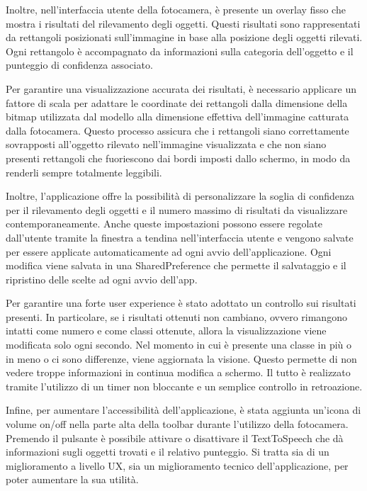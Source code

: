 Inoltre, nell'interfaccia utente della fotocamera, è presente un overlay fisso che mostra i risultati del rilevamento degli oggetti. Questi risultati sono
rappresentati da rettangoli posizionati sull'immagine in base alla posizione degli oggetti rilevati. Ogni rettangolo è accompagnato da informazioni sulla
categoria dell'oggetto e il punteggio di confidenza associato.

Per garantire una visualizzazione accurata dei risultati, è necessario applicare un fattore di scala per adattare le coordinate dei rettangoli dalla
dimensione della bitmap utilizzata dal modello alla dimensione effettiva dell'immagine catturata dalla fotocamera. Questo processo assicura che i rettangoli
siano correttamente sovrapposti all'oggetto rilevato nell'immagine visualizzata e che non siano presenti rettangoli che fuoriescono dai bordi imposti dallo
schermo, in modo da renderli sempre totalmente leggibili.

Inoltre, l'applicazione offre la possibilità di personalizzare la soglia di confidenza per il rilevamento degli oggetti e il numero massimo di risultati da
visualizzare contemporaneamente. Anche queste impostazioni possono essere regolate dall'utente tramite la finestra a tendina nell'interfaccia utente e
vengono salvate per essere applicate automaticamente ad ogni avvio dell'applicazione.
Ogni modifica viene salvata in una SharedPreference che permette il salvataggio e il ripristino delle scelte ad ogni avvio dell’app.

Per garantire una forte user experience è stato adottato un controllo sui risultati presenti. In particolare, se i risultati ottenuti non cambiano, ovvero
rimangono intatti come numero e come classi ottenute, allora la visualizzazione viene modificata solo ogni secondo. Nel momento in cui è presente una classe
in più o in meno o ci sono differenze, viene aggiornata la visione. Questo permette di non vedere troppe informazioni in continua modifica a schermo. Il
tutto è realizzato tramite l’utilizzo di un timer non bloccante e un semplice controllo in retroazione.

Infine, per aumentare l’accessibilità dell’applicazione, è stata aggiunta un’icona di volume on/off nella parte alta della toolbar durante l’utilizzo
della fotocamera. Premendo il pulsante è possibile attivare o disattivare il TextToSpeech che dà informazioni sugli oggetti trovati e il relativo
punteggio. Si tratta sia di un miglioramento a livello UX, sia un miglioramento tecnico dell’applicazione, per poter aumentare la sua utilità.

